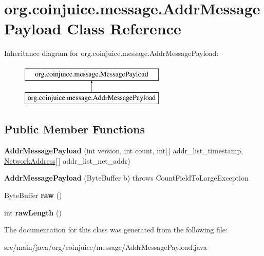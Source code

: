 \hypertarget{classorg_1_1coinjuice_1_1message_1_1_addr_message_payload}{\section{org.\-coinjuice.\-message.\-Addr\-Message\-Payload Class Reference}
\label{classorg_1_1coinjuice_1_1message_1_1_addr_message_payload}
}
Inheritance diagram for org.\-coinjuice.\-message.\-Addr\-Message\-Payload\-:\begin{figure}[H]
\begin{center}
\leavevmode
\includegraphics[height=2.000000cm]{classorg_1_1coinjuice_1_1message_1_1_addr_message_payload}
\end{center}
\end{figure}
\subsection*{Public Member Functions}
\begin{DoxyCompactItemize}
\item 
\hypertarget{classorg_1_1coinjuice_1_1message_1_1_addr_message_payload_a973a325adbc1b48796212520492b17ac}{{\bfseries Addr\-Message\-Payload} (int version, int count, int\mbox{[}$\,$\mbox{]} addr\-\_\-list\-\_\-timestamp, \hyperlink{classorg_1_1coinjuice_1_1message_1_1field_1_1_network_address}{Network\-Address}\mbox{[}$\,$\mbox{]} addr\-\_\-list\-\_\-net\-\_\-addr)}\label{classorg_1_1coinjuice_1_1message_1_1_addr_message_payload_a973a325adbc1b48796212520492b17ac}

\item 
\hypertarget{classorg_1_1coinjuice_1_1message_1_1_addr_message_payload_a859a5a2e74ada33b23f1a00af4a2d5e9}{{\bfseries Addr\-Message\-Payload} (Byte\-Buffer b)  throws Count\-Field\-To\-Large\-Exception }\label{classorg_1_1coinjuice_1_1message_1_1_addr_message_payload_a859a5a2e74ada33b23f1a00af4a2d5e9}

\item 
\hypertarget{classorg_1_1coinjuice_1_1message_1_1_addr_message_payload_a937501364737a5bcf7d20242b5a3208b}{Byte\-Buffer {\bfseries raw} ()}\label{classorg_1_1coinjuice_1_1message_1_1_addr_message_payload_a937501364737a5bcf7d20242b5a3208b}

\item 
\hypertarget{classorg_1_1coinjuice_1_1message_1_1_addr_message_payload_a85f692fdde0a7e22e55eab8334238f12}{int {\bfseries raw\-Length} ()}\label{classorg_1_1coinjuice_1_1message_1_1_addr_message_payload_a85f692fdde0a7e22e55eab8334238f12}

\end{DoxyCompactItemize}


The documentation for this class was generated from the following file\-:\begin{DoxyCompactItemize}
\item 
src/main/java/org/coinjuice/message/Addr\-Message\-Payload.\-java\end{DoxyCompactItemize}
